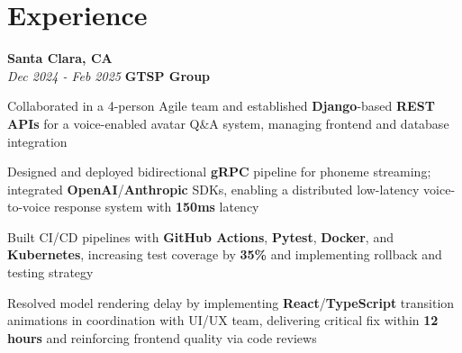 \section{Experience}

\begin{twocolentry}{
    \textbf{Santa Clara, CA} \\
    \textit{Dec 2024 - Feb 2025}
}{
    \textbf{GTSP Group} \\
}
\end{twocolentry}
\begin{onecolentry}
    \begin{highlights}
        \item Collaborated in a 4-person Agile team and established \textbf{Django}-based \textbf{REST APIs} for a voice-enabled avatar Q\&A system, managing frontend and database integration
        \item Designed and deployed bidirectional \textbf{gRPC} pipeline for phoneme streaming; integrated \textbf{OpenAI}/\textbf{Anthropic} SDKs, enabling a distributed low-latency voice-to-voice response system with \textbf{150ms} latency
        \item Built CI/CD pipelines with \textbf{GitHub Actions}, \textbf{Pytest}, \textbf{Docker}, and \textbf{Kubernetes}, increasing test coverage by \textbf{35\%} and implementing rollback and testing strategy
        \item Resolved model rendering delay by implementing \textbf{React}/\textbf{TypeScript} transition animations in coordination with UI/UX team, delivering critical fix within \textbf{12 hours} and reinforcing frontend quality via code reviews
    \end{highlights}
\end{onecolentry}

\vspace{0.2cm}

